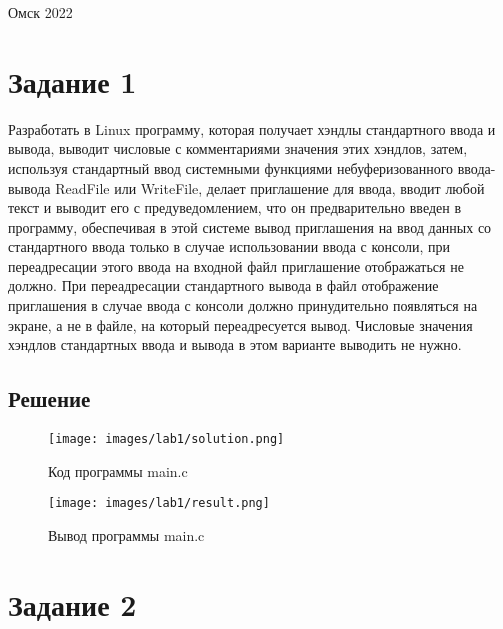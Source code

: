 \documentclass[14pt, a4paper]{article}
\begin{document}
    \vspace*{\fill}
    \begin{center}
        Омск 2022
    \end{center}

    \newpage

    \section*{Задание 1}

    Разработать в Linux программу, которая получает хэндлы стандартного ввода и вывода, выводит числовые с комментариями значения этих хэндлов, затем, используя стандартный ввод системными функциями небуферизованного ввода-вывода ReadFile или WriteFile, делает приглашение для ввода, вводит любой текст и выводит его с предуведомлением, что он предварительно введен в программу, обеспечивая в этой системе вывод приглашения на ввод данных со стандартного ввода только в случае использовании ввода с консоли, при переадресации этого ввода на входной файл приглашение отображаться не должно. При переадресации стандартного вывода в файл отображение приглашения в случае ввода с консоли должно принудительно появляться на экране, а не в файле, на который переадресуется вывод. Числовые значения хэндлов стандартных ввода и вывода в этом варианте выводить не нужно.

    \subsection*{Решение}

    \begin{figure}[H]
        \centering
        \texttt{[image: images/lab1/solution.png]}
        \caption{Код программы main.c}
    \end{figure}

    \begin{figure}[H]
        \centering
        \texttt{[image: images/lab1/result.png]}
        \caption{Вывод программы main.c}
    \end{figure}

    \newpage

    \section*{Задание 2}
\end{document}
